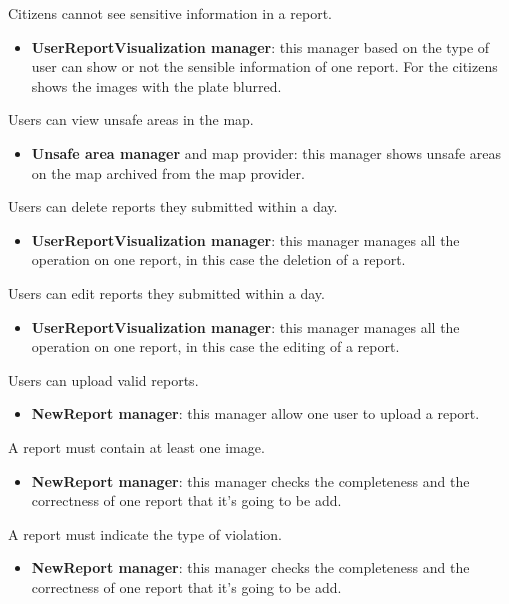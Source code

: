 \documentclass[../RASD.tex]{subfiles}
\begin{document}
\begin{enumerate}
         Citizens cannot see sensitive information in a report.
        \begin{itemize}
            \item \textbf{UserReportVisualization manager}: this manager based on the type of user can show or not the sensible information of one report. For the citizens shows the images with the plate blurred.
        \end{itemize}

         Users can view unsafe areas in the map.
        \begin{itemize}
            \item \textbf{Unsafe area manager} and map provider: this manager shows unsafe areas on the map archived from the map provider.
        \end{itemize}

         Users can delete reports they submitted within a day.
        \begin{itemize}
            \item \textbf{UserReportVisualization manager}: this manager manages all the operation on one report, in this case the deletion of a report.
        \end{itemize}

         Users can edit reports they submitted within a day.
        \begin{itemize}
            \item \textbf{UserReportVisualization manager}: this manager manages all the operation on one report, in this case the editing of a report.
        \end{itemize}

         Users can upload valid reports.
        \begin{itemize}
            \item \textbf{NewReport manager}: this manager allow one user to upload a report.
        \end{itemize}

         A report must contain at least one image.
        \begin{itemize}
            \item \textbf{NewReport manager}: this manager checks the completeness and the correctness of one report that it’s going to be add.
        \end{itemize}

         A report must indicate the type of violation.
        \begin{itemize}
            \item \textbf{NewReport manager}: this manager checks the completeness and the correctness of one report that it’s going to be add.
        \end{itemize}


\end{enumerate}
\end{document}
